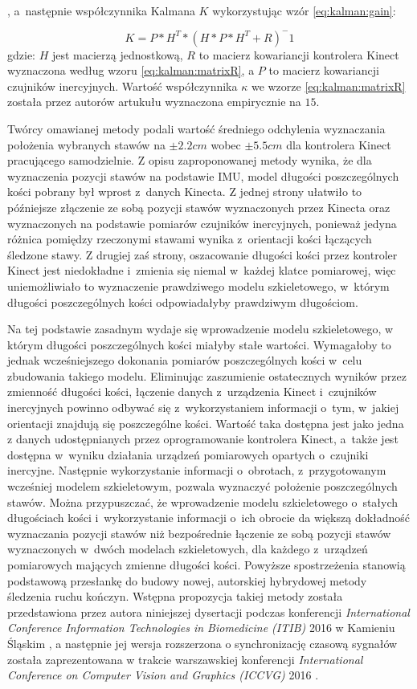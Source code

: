 , a~następnie współczynnika Kalmana $K$ wykorzystując wzór \ref{eq:kalman:gain}:
											
\begin{equation}
	K = P * H^T * (H * P * H^T +R)^-1
	\label{eq:kalman:gain}
\end{equation}
gdzie: $H$ jest macierzą jednostkową, $R$ to macierz kowariancji kontrolera Kinect wyznaczona według wzoru \ref{eq:kalman:matrixR}, a $P$ to macierz kowariancji czujników inercyjnych. Wartość współczynnika $\kappa$ we wzorze \ref{eq:kalman:matrixR} została przez autorów artukułu wyznaczona empirycznie na $15$.

Twórcy omawianej metody podali wartość średniego odchylenia wyznaczania położenia wybranych stawów na $\pm 2.2cm$ wobec $\pm 5.5cm$ dla kontrolera Kinect pracującego samodzielnie. Z opisu zaproponowanej metody wynika, że dla wyznaczenia pozycji stawów na podstawie IMU, model długości poszczególnych kości pobrany był wprost z~danych Kinecta. Z jednej strony ułatwiło to późniejsze złączenie ze sobą pozycji stawów wyznaczonych przez Kinecta oraz wyznaczonych na podstawie pomiarów czujników inercyjnych, ponieważ jedyna różnica pomiędzy rzeczonymi stawami wynika z~orientacji kości łączących śledzone stawy. Z drugiej zaś strony, oszacowanie długości kości przez kontroler Kinect jest niedokładne i~zmienia się niemal w~każdej klatce pomiarowej, więc uniemożliwiało to wyznaczenie prawdziwego modelu szkieletowego, w~którym długości poszczególnych kości odpowiadałyby prawdziwym długościom.

Na tej podstawie zasadnym wydaje się wprowadzenie modelu szkieletowego, w którym długości poszczególnych kości miałyby stałe wartości. Wymagałoby to jednak wcześniejszego dokonania pomiarów poszczególnych kości w~celu zbudowania takiego modelu. Eliminując zaszumienie ostatecznych wyników przez zmienność długości kości, łączenie danych z~urządzenia Kinect i~czujników inercyjnych powinno odbywać się z~wykorzystaniem informacji o~tym, w~jakiej orientacji znajdują się poszczególne kości. Wartość taka dostępna jest jako jedna z danych udostępnianych przez oprogramowanie kontrolera Kinect, a~także jest dostępna w~wyniku działania urządzeń pomiarowych opartych o~czujniki inercyjne. Następnie wykorzystanie informacji o~obrotach, z~przygotowanym wcześniej modelem szkieletowym, pozwala wyznaczyć położenie poszczególnych stawów. Można przypuszczać, że wprowadzenie modelu szkieletowego o~stałych długościach kości i~wykorzystanie informacji o~ich obrocie da większą dokładność wyznaczania pozycji stawów niż bezpośrednie łączenie ze sobą pozycji stawów wyznaczonych w~dwóch modelach szkieletowych, dla każdego z~urządzeń pomiarowych mających zmienne długości kości. Powyższe spostrzeżenia stanowią podstawową przesłankę do budowy nowej, autorskiej hybrydowej metody śledzenia ruchu kończyn. Wstępna propozycja takiej metody została przedstawiona przez autora niniejszej dysertacji podczas konferencji \emph{International Conference Information Technologies in Biomedicine (ITIB)} 2016 w Kamieniu Śląskim \cite{Glonek_Wojciechowski_2016_ITIB}, a następnie jej wersja rozszerzona o synchronizację czasową sygnałów została zaprezentowana w trakcie warszawskiej konferencji \emph{International Conference on Computer Vision and Graphics (ICCVG)} 2016 \cite{Glonek_Wojciechowski_2016_ICCVG}.